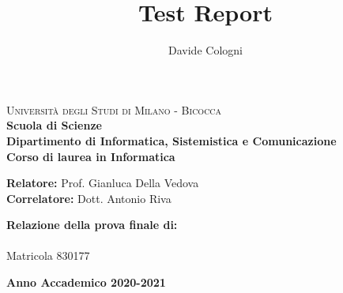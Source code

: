 \documentclass[a4paper,12pt,twoside,openright]{report}
\title{Test Report}
\author{Davide Cologni}
\makeatletter
\let\inserttitle\@title
\let\insertauthor\@author
\makeatother
\begin{document}
    
    \begin{titlepage}
        
        \noindent
        \begin{minipage}[t]{0.19\textwidth}
        \end{minipage}
        \begin{minipage}[t]{0.81\textwidth}
        {
                {\textsc{Università degli Studi di Milano - Bicocca}} \\
                \textbf{Scuola di Scienze} \\
                \textbf{Dipartimento di Informatica, Sistemistica e Comunicazione} \\
                \textbf{Corso di laurea in Informatica} \\
                \par
        }
        \end{minipage}
        
	\vspace{40mm}
        
	\begin{center}
            {\LARGE{
                    \textbf{\inserttitle}
                    \par
            }}
        \end{center}
        
        \vspace{50mm}

        \noindent
        {\large \textbf{Relatore:} Prof. Gianluca Della Vedova } \\

        \noindent
        {\large \textbf{Correlatore:} Dott. Antonio Riva}
        
        \vspace{15mm}

        \begin{flushright}
            {\large \textbf{Relazione della prova finale di:}} \\
            \large{\insertauthor} \\
            \large{Matricola 830177} 
        \end{flushright}
        
        \vspace{40mm}
        \begin{center}
            {\large{\bf Anno Accademico 2020-2021}}
        \end{center}
        
        \restoregeometry
        
    \end{titlepage}
\end{document}
